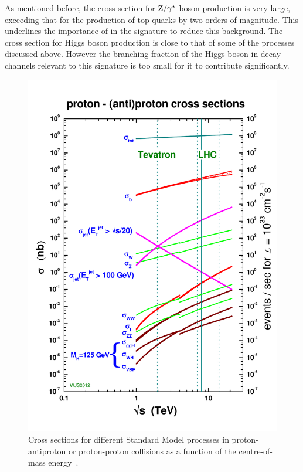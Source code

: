 As mentioned before, the cross section for $\mathrm{Z}/\gamma^{\star}$ boson production is very large, exceeding that for the production of top quarks by two orders of magnitude. This underlines the importance of \MET in the signature to reduce this background.
The cross section for Higgs boson production is close to that of some of the processes discussed above. However the branching fraction of the Higgs boson in decay channels relevant to this signature is too small for it to contribute significantly. 
\begin{figure}
\centering
\includegraphics[scale=0.5]{plots/THEO/crosssections2012_v5.pdf}
\caption{Cross sections for different Standard Model processes in proton-antiproton or proton-proton collisions as a function of the centre-of-mass energy~\cite{sterling}.}
\label{fig:xsecs}
\end{figure}  